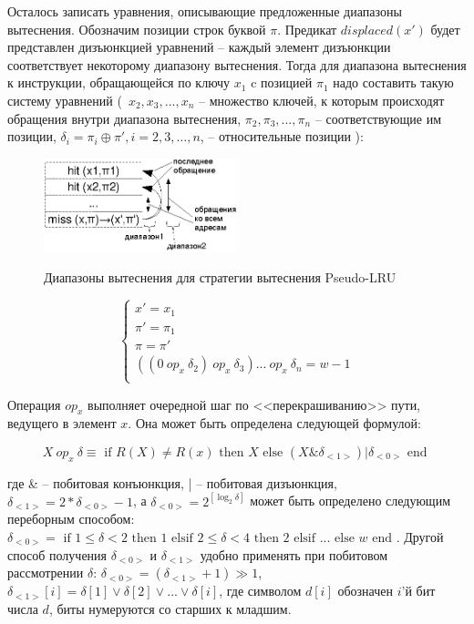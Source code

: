 \documentclass[14pt]{extreport}
\newcommand{\PseudoLRU}{\textsf{Pseudo-LRU}\xspace}
\begin{document}
Осталось записать уравнения, описывающие предложенные диапазоны
вытеснения. Обозначим позиции строк буквой $\pi$. Предикат $displaced(x')$ будет
представлен дизъюнкцией уравнений -- каждый элемент дизъюнкции
соответствует некоторому диапазону вытеснения. Тогда для диапазона
вытеснения к инструкции, обращающейся по ключу $x_1$ c позицией
$\pi_1$ надо составить такую систему уравнений (~$x_2, x_3, ...,
x_n$ -- множество ключей, к которым происходят обращения внутри
диапазона вытеснения, $\pi_2, \pi_3, ..., \pi_n$ -- соответствующие
им позиции, $\delta_i = \pi_i \oplus \pi', i = 2,3,\dots,n$, --
относительные позиции ):

\begin{figure}[h] \center
  \includegraphics[width=0.5\textwidth]{2.theor/plru-ranges}\\
  \caption{Диапазоны вытеснения для стратегии вытеснения \PseudoLRU}
\end{figure}

$$
\left\{
\begin{array}{l}
x' = x_1\\
\pi' = \pi_1\\
\pi = \pi'\\
((0~op_x~\delta_2)~op_x~\delta_3) ... ~op_x~\delta_n  = w-1\\
\end{array}
\right.
$$

Операция $op_x$ выполняет очередной шаг по <<перекрашиванию>> пути,
ведущего в элемент $x$. Она может быть определена следующей формулой:

$$X~op_x~\delta \equiv \mbox{~if~} R(X) \neq R(x) \mbox{~then~} X \mbox{~else~}
(X \&
\delta_{<1>}) | \delta_{<0>} \mbox{~end~}$$

где \& -- побитовая конъюнкция, | -- побитовая дизъюнкция,
$\delta_{<1>} = 2 * \delta_{<0>} - 1$, а $\delta_{<0>} = 2^{[\log_2
\delta]}$ может быть определено следующим переборным способом:
$\delta_{<0>} = \mbox{~if~} 1 \leqslant \delta < 2 \mbox{~then~} 1
\mbox{~elsif~} 2 \leqslant \delta < 4 \mbox{~then~} 2 \mbox{~elsif~}
... \mbox{~else~} w \mbox{~end~}$. Другой способ получения
$\delta_{<0>}$ и $\delta_{<1>}$ удобно применять при побитовом
рассмотрении $\delta$: $\delta_{<0>} = (\delta_{<1>} + 1) \gg 1$,
$\delta_{<1>}[i] = \delta[1] \vee \delta[2] \vee ... \vee
\delta[i]$, где символом $d[i]$ обозначен $i$'й бит числа $d$, биты
нумеруются со старших к младшим.
\end{document}
